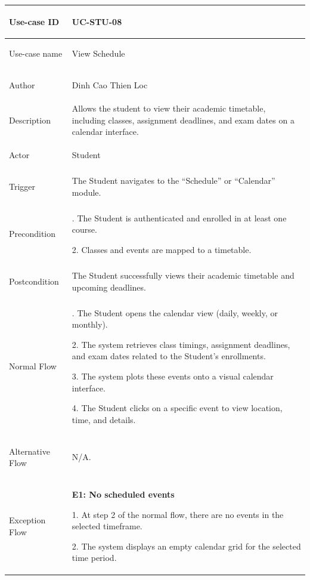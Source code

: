 {
\renewcommand{\arraystretch}{1.1}
\setlength{\tabcolsep}{8pt}
\begin{longtable}{|>{\bfseries\raggedright\arraybackslash}p{}|>{\raggedright\arraybackslash}p{}|}
\hline
Use-case ID & UC-STU-08 \\ \hline
Use-case name & View Schedule \\ \hline
Author & Dinh Cao Thien Loc \\ \hline
Description & Allows the student to view their academic timetable, including classes, assignment deadlines, and exam dates on a calendar interface. \\ \hline
Actor & Student \\ \hline
Trigger & The Student navigates to the ``Schedule'' or ``Calendar'' module. \\ \hline
Precondition &
1. The Student is authenticated and enrolled in at least one course. \par
2. Classes and events are mapped to a timetable. \\ \hline
Postcondition & The Student successfully views their academic timetable and upcoming deadlines. \\ \hline
Normal Flow &
1. The Student opens the calendar view (daily, weekly, or monthly). \par
2. The system retrieves class timings, assignment deadlines, and exam dates related to the Student's enrollments. \par
3. The system plots these events onto a visual calendar interface. \par
4. The Student clicks on a specific event to view location, time, and details. \\ \hline
Alternative Flow & N/A. \\ \hline
Exception Flow &
\textbf{E1: No scheduled events} \par
1. At step 2 of the normal flow, there are no events in the selected timeframe. \par
2. The system displays an empty calendar grid for the selected time period. \\ \hline
\end{longtable}
}

